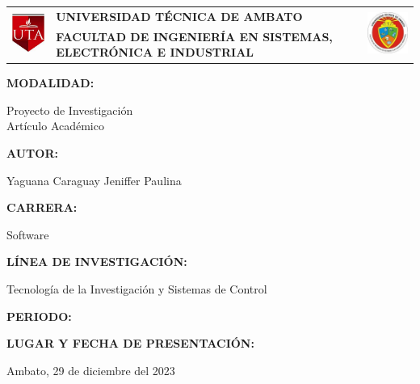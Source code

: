 \begin{titlepage}
	\begin{center}
		\begin{tabular}{l  p{}  l}
			\multirow{2}{*}{
				\includegraphics[width=20mm]{resources/images/logo-uta-rojo.png}
			}                                                             &
			\bfseries\uppercase{\centering Universidad Técnica de Ambato} &
			\multirow{2}{*}{
				\includegraphics[width=25mm]{resources/images/logo-fisei-feo.jpeg}
			}                                                                                                                                                              \\
			& \bfseries\uppercase{\centering Facultad de Ingeniería en Sistemas, Electrónica e Industrial} & \\
		\end{tabular}
		\vspace{2cm}
	\end{center}
	{\textbf{MODALIDAD: }\par}
	\begin{center}
		Proyecto de Investigación  \\
		Artículo Académico \fbox{\phantom{X}}
	\end{center}
	{\textbf{AUTOR: }\par}
	\begin{center}
		Yaguana Caraguay Jeniffer Paulina
	\end{center}
	{\textbf{CARRERA: }\par}
	\begin{center}
		Software
	\end{center}
	{\textbf{LÍNEA DE INVESTIGACIÓN: }\par}
	\begin{center}
		Tecnología de la Investigación y Sistemas de Control
	\end{center}
	{\textbf{PERIODO: }\par}
	\begin{center}
		\periodo
	\end{center}
	{\textbf{LUGAR Y FECHA DE PRESENTACIÓN: }\par}
	\begin{center}
		Ambato, 29 de diciembre del 2023
	\end{center}
	\vfill
\end{titlepage}
